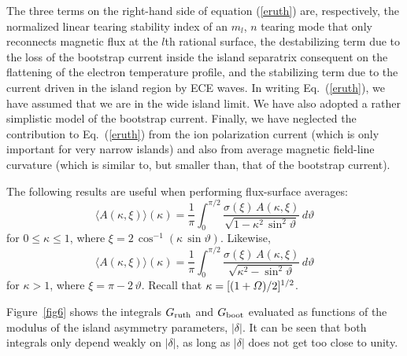 \documentclass[12pt,prb,aps]{revtex4-1}
\begin{document}
 The three terms on the right-hand side of equation (\ref{eruth}) are, respectively, the normalized linear tearing stability index of an $m_l$, $n$ tearing mode
 that only reconnects magnetic flux at the $l$th rational surface,\cite{tear5} the
 destabilizing term due to the loss of the bootstrap current inside the island separatrix consequent on the flattening of the electron temperature profile,\cite{ntm2} and the stabilizing term due to the current driven in the island region by ECE waves.\cite{island} In writing Eq.~(\ref{eruth}), we have
 assumed that we are in the wide island limit.\cite{island} We have also adopted a rather simplistic model of the bootstrap current.\cite{boot}
 Finally, we have neglected the contribution to  Eq.~(\ref{eruth}) from the ion polarization current (which is only important for
 very narrow islands) and also from average magnetic field-line curvature (which is similar to, but smaller than,  that of the bootstrap current).\cite{ntm4}
 
 The following results are useful when performing flux-surface averages:\,\cite{island}
\begin{equation}
\langle A(\kappa,\xi)\rangle(\kappa) = \frac{1}{\pi}\int_0^{\pi/2}\frac{\sigma(\xi)\,A(\kappa,\xi)}{\sqrt{1-\kappa^2\,\sin^2\vartheta}}\,d\vartheta
\end{equation}
for $0\leq \kappa\leq 1$, where $\xi=2\,\cos^{-1}(\kappa\,\sin\vartheta)$. Likewise, 
\begin{equation}
\langle A(\kappa,\xi)\rangle(\kappa) = \frac{1}{\pi}\int_0^{\pi/2}\frac{\sigma(\xi)\,A(\kappa,\xi)}{\sqrt{\kappa^2-\sin^2\vartheta}}\,d\vartheta
\end{equation}
for $\kappa>1$, where $\xi=\pi-2\,\vartheta$. Recall that $\kappa=[(1+{\mit\Omega})/2]^{1/2}$. 

Figure~\ref{fig6} shows the integrals $G_{\rm ruth}$ and $G_{\rm boot}$ evaluated as functions of the modulus of the island asymmetry
parameters, $|\delta|$. It can be seen that both integrals only depend weakly on $|\delta|$, as long as $|\delta|$ does not get too close to
unity.\cite{ece6}
 
\end{document}
